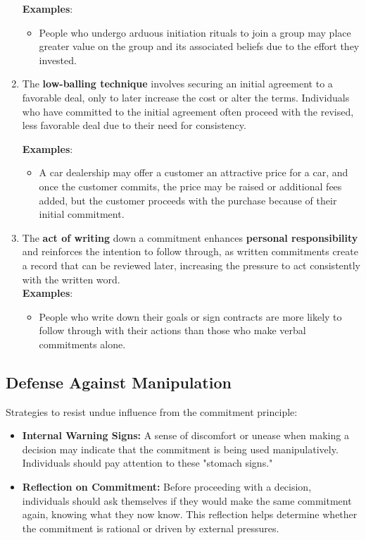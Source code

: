 \begin{enumerate}
    \textbf{Examples}:
    \begin{itemize}
        \item People who undergo arduous initiation rituals to join a group may place greater value on the group and its associated beliefs due to the effort they invested.
    \end{itemize}
    \item The \textbf{low-balling technique} involves securing an initial agreement to a favorable deal, only to later increase the cost or alter the terms. Individuals who have committed to the initial agreement often proceed with the revised, less favorable deal due to their need for consistency.

    \textbf{Examples}:
    \begin{itemize}
        \item A car dealership may offer a customer an attractive price for a car, and once the customer commits, the price may be raised or additional fees added, but the customer proceeds with the purchase because of their initial commitment.
    \end{itemize}
    \item The \textbf{act of writing} down a commitment enhances \textbf{personal responsibility} and reinforces the intention to follow through, as written commitments create a record that can be reviewed later, increasing the pressure to act consistently with the written word.\\
    \textbf{Examples}:
    \begin{itemize}
        \item People who write down their goals or sign contracts are more likely to follow through with their actions than those who make verbal commitments alone.
    \end{itemize}
\end{enumerate}


\subsection*{Defense Against Manipulation}
Strategies to resist undue influence from the commitment principle:
\begin{itemize}
    \item \textbf{Internal Warning Signs:} A sense of discomfort or unease when making a decision may indicate that the commitment is being used manipulatively. Individuals should pay attention to these "stomach signs."
    \item \textbf{Reflection on Commitment:} Before proceeding with a decision, individuals should ask themselves if they would make the same commitment again, knowing what they now know. This reflection helps determine whether the commitment is rational or driven by external pressures.
\end{itemize}

